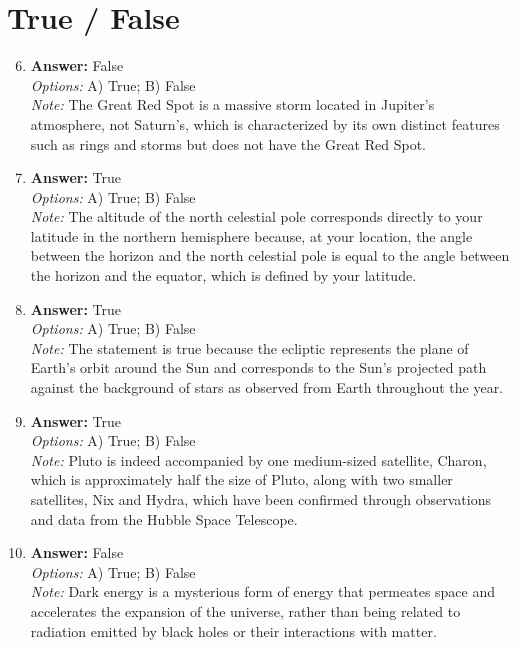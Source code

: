 \documentclass[12pt]{article}
\begin{document}
\section*{True / False}
\begin{enumerate}[label=\arabic*.]
\setcounter{enumi}{5}
\item \textbf{Answer:} False
\\ \textit{Options:} A) True; B) False
\\ \textit{Note:} The Great Red Spot is a massive storm located in Jupiter's atmosphere, not Saturn's, which is characterized by its own distinct features such as rings and storms but does not have the Great Red Spot.
\item \textbf{Answer:} True
\\ \textit{Options:} A) True; B) False
\\ \textit{Note:} The altitude of the north celestial pole corresponds directly to your latitude in the northern hemisphere because, at your location, the angle between the horizon and the north celestial pole is equal to the angle between the horizon and the equator, which is defined by your latitude.
\item \textbf{Answer:} True
\\ \textit{Options:} A) True; B) False
\\ \textit{Note:} The statement is true because the ecliptic represents the plane of Earth's orbit around the Sun and corresponds to the Sun's projected path against the background of stars as observed from Earth throughout the year.
\item \textbf{Answer:} True
\\ \textit{Options:} A) True; B) False
\\ \textit{Note:} Pluto is indeed accompanied by one medium-sized satellite, Charon, which is approximately half the size of Pluto, along with two smaller satellites, Nix and Hydra, which have been confirmed through observations and data from the Hubble Space Telescope.
\item \textbf{Answer:} False
\\ \textit{Options:} A) True; B) False
\\ \textit{Note:} Dark energy is a mysterious form of energy that permeates space and accelerates the expansion of the universe, rather than being related to radiation emitted by black holes or their interactions with matter.
\end{enumerate}
\end{document}

